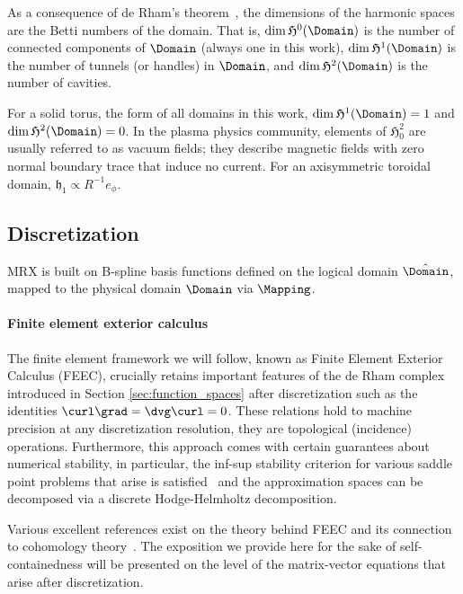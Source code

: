 \documentclass[%
 reprint,
 superscriptaddress,
 amsmath,amssymb,
 aps, nofootinbib, floatfix]{revtex4-2}
\begin{document}
As a consequence of de Rham's theorem~\citep[Section 7.5]{abraham_manifolds_1988}, the dimensions of the harmonic spaces are the Betti numbers of the domain. That is, $\dim \mathfrak{H}^0(\Domain)$ is the number of connected components of $\Domain$ (always one in this work), $\dim \mathfrak{H}^1(\Domain)$ is the number of tunnels (or handles) in $\Domain$, and $\dim \mathfrak{H}^2(\Domain)$ is the number of cavities.

For a solid torus, the form of all domains in this work, $\dim \mathfrak{H}^1(\Domain) = 1$ and $\dim \mathfrak{H}^2(\Domain) = 0$.
%
In the plasma physics community, elements of $\mathfrak{H}^2_0$ are usually referred to as vacuum fields; they describe magnetic fields with zero normal boundary trace that induce no current. For an axisymmetric toroidal domain, $\mathfrak h_1 \propto R^{-1} e_\phi$.

\subsection{Discretization}
\label{subsec:discretization}

MRX is built on B-spline basis functions defined on the logical domain $\hat \Domain$, mapped to the physical domain $\Domain$ via $\Mapping$.   

\paragraph{Finite element exterior calculus}
%
The finite element framework we will follow, known as Finite Element Exterior Calculus (FEEC), crucially retains important features of the de Rham complex introduced in Section \ref{sec:function_spaces} after discretization such as the identities $\curl \grad = \dvg \curl = 0$. These relations hold to machine precision at any discretization resolution, they are topological (incidence) operations. Furthermore, this approach comes with certain guarantees about numerical stability, in particular, the inf-sup stability criterion for various saddle point problems that arise is satisfied~\citep[Theorem 3.8]{arnold_finite_2010} and the approximation spaces can be decomposed via a discrete Hodge-Helmholtz decomposition.

Various excellent references exist on the theory behind FEEC and its connection to cohomology theory~\citep{arnold_finite_2006, arnold_finite_2010}. The exposition we provide here for the sake of self-containedness will be presented on the level of the matrix-vector equations that arise after discretization.
\end{document}
